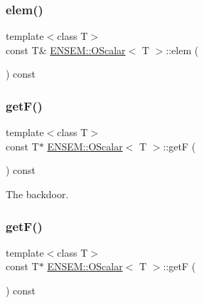 \mbox{\label{classENSEM_1_1OScalar_af797ae7d3763acab7b024aa159b3a7b8}} 
\subsubsection{\texorpdfstring{elem()}{elem()}\hspace{0.1cm}{\footnotesize\ttfamily [6/6]}}
{\footnotesize\ttfamily template$<$class T$>$ \\
const T\& \mbox{\hyperlink{classENSEM_1_1OScalar}{E\+N\+S\+E\+M\+::\+O\+Scalar}}$<$ T $>$\+::elem (\begin{DoxyParamCaption}{ }\end{DoxyParamCaption}) const\hspace{0.3cm}{\ttfamily [inline]}}

\mbox{\label{classENSEM_1_1OScalar_a8e87e97e45239d934b0d141dcf9b92d7}} 
\subsubsection{\texorpdfstring{getF()}{getF()}\hspace{0.1cm}{\footnotesize\ttfamily [1/6]}}
{\footnotesize\ttfamily template$<$class T$>$ \\
const T$\ast$ \mbox{\hyperlink{classENSEM_1_1OScalar}{E\+N\+S\+E\+M\+::\+O\+Scalar}}$<$ T $>$\+::getF (\begin{DoxyParamCaption}{ }\end{DoxyParamCaption}) const\hspace{0.3cm}{\ttfamily [inline]}}



The backdoor. 

\mbox{\label{classENSEM_1_1OScalar_a8e87e97e45239d934b0d141dcf9b92d7}} 
\subsubsection{\texorpdfstring{getF()}{getF()}\hspace{0.1cm}{\footnotesize\ttfamily [2/6]}}
{\footnotesize\ttfamily template$<$class T$>$ \\
const T$\ast$ \mbox{\hyperlink{classENSEM_1_1OScalar}{E\+N\+S\+E\+M\+::\+O\+Scalar}}$<$ T $>$\+::getF (\begin{DoxyParamCaption}{ }\end{DoxyParamCaption}) const\hspace{0.3cm}{\ttfamily [inline]}}




